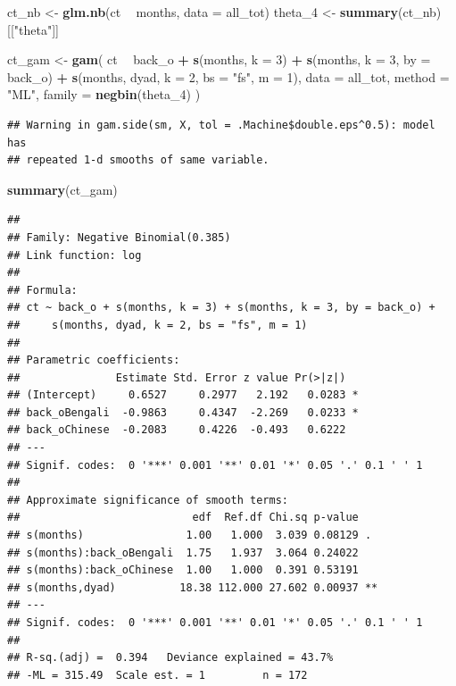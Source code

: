 \documentclass[]{article}
\newenvironment{Shaded}{\begin{snugshade}}{\end{snugshade}}
\newcommand{\DataTypeTok}[1]{\textcolor[rgb]{0.13,0.29,0.53}{#1}}
\newcommand{\DecValTok}[1]{\textcolor[rgb]{0.00,0.00,0.81}{#1}}
\newcommand{\KeywordTok}[1]{\textcolor[rgb]{0.13,0.29,0.53}{\textbf{#1}}}
\newcommand{\NormalTok}[1]{#1}
\newcommand{\OperatorTok}[1]{\textcolor[rgb]{0.81,0.36,0.00}{\textbf{#1}}}
\newcommand{\StringTok}[1]{\textcolor[rgb]{0.31,0.60,0.02}{#1}}
\begin{document}
\begin{Shaded}
\begin{Highlighting}[]
\NormalTok{ct_nb <-}\StringTok{ }\KeywordTok{glm.nb}\NormalTok{(ct }\OperatorTok{~}\StringTok{ }\NormalTok{months, }\DataTypeTok{data =}\NormalTok{ all_tot)}
\NormalTok{theta_}\DecValTok{4}\NormalTok{ <-}\StringTok{ }\KeywordTok{summary}\NormalTok{(ct_nb)[[}\StringTok{"theta"}\NormalTok{]]}

\NormalTok{ct_gam <-}\StringTok{ }\KeywordTok{gam}\NormalTok{(}
\NormalTok{  ct }\OperatorTok{~}
\StringTok{    }\NormalTok{back_o }\OperatorTok{+}
\StringTok{    }\KeywordTok{s}\NormalTok{(months, }\DataTypeTok{k =} \DecValTok{3}\NormalTok{) }\OperatorTok{+}
\StringTok{    }\KeywordTok{s}\NormalTok{(months, }\DataTypeTok{k =} \DecValTok{3}\NormalTok{, }\DataTypeTok{by =}\NormalTok{ back_o) }\OperatorTok{+}
\StringTok{    }\KeywordTok{s}\NormalTok{(months, dyad, }\DataTypeTok{k =} \DecValTok{2}\NormalTok{, }\DataTypeTok{bs =} \StringTok{"fs"}\NormalTok{, }\DataTypeTok{m =} \DecValTok{1}\NormalTok{),}
  \DataTypeTok{data =}\NormalTok{ all_tot,}
  \DataTypeTok{method =} \StringTok{"ML"}\NormalTok{,}
  \DataTypeTok{family =} \KeywordTok{negbin}\NormalTok{(theta_}\DecValTok{4}\NormalTok{)}
\NormalTok{)}
\end{Highlighting}
\end{Shaded}

\begin{verbatim}
## Warning in gam.side(sm, X, tol = .Machine$double.eps^0.5): model has
## repeated 1-d smooths of same variable.
\end{verbatim}

\begin{Shaded}
\begin{Highlighting}[]
\KeywordTok{summary}\NormalTok{(ct_gam)}
\end{Highlighting}
\end{Shaded}

\begin{verbatim}
## 
## Family: Negative Binomial(0.385) 
## Link function: log 
## 
## Formula:
## ct ~ back_o + s(months, k = 3) + s(months, k = 3, by = back_o) + 
##     s(months, dyad, k = 2, bs = "fs", m = 1)
## 
## Parametric coefficients:
##               Estimate Std. Error z value Pr(>|z|)  
## (Intercept)     0.6527     0.2977   2.192   0.0283 *
## back_oBengali  -0.9863     0.4347  -2.269   0.0233 *
## back_oChinese  -0.2083     0.4226  -0.493   0.6222  
## ---
## Signif. codes:  0 '***' 0.001 '**' 0.01 '*' 0.05 '.' 0.1 ' ' 1
## 
## Approximate significance of smooth terms:
##                           edf  Ref.df Chi.sq p-value   
## s(months)                1.00   1.000  3.039 0.08129 . 
## s(months):back_oBengali  1.75   1.937  3.064 0.24022   
## s(months):back_oChinese  1.00   1.000  0.391 0.53191   
## s(months,dyad)          18.38 112.000 27.602 0.00937 **
## ---
## Signif. codes:  0 '***' 0.001 '**' 0.01 '*' 0.05 '.' 0.1 ' ' 1
## 
## R-sq.(adj) =  0.394   Deviance explained = 43.7%
## -ML = 315.49  Scale est. = 1         n = 172
\end{verbatim}
\end{document}
